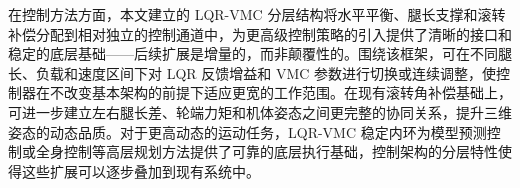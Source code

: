 在控制方法方面，本文建立的 LQR-VMC 分层结构将水平平衡、腿长支撑和滚转补偿分配到相对独立的控制通道中，为更高级控制策略的引入提供了清晰的接口和稳定的底层基础——后续扩展是增量的，而非颠覆性的。围绕该框架，可在不同腿长、负载和速度区间下对 LQR 反馈增益和 VMC 参数进行切换或连续调整，使控制器在不改变基本架构的前提下适应更宽的工作范围。在现有滚转角补偿基础上，可进一步建立左右腿长差、轮端力矩和机体姿态之间更完整的协同关系，提升三维姿态的动态品质。对于更高动态的运动任务，LQR-VMC 稳定内环为模型预测控制或全身控制等高层规划方法提供了可靠的底层执行基础，控制架构的分层特性使得这些扩展可以逐步叠加到现有系统中。
